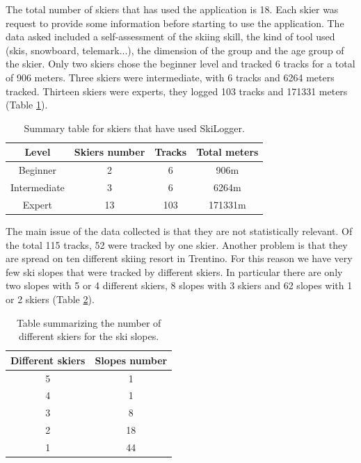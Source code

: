 \documentclass[12pt,a4paper,twoside]{book}
\begin{document}
The total number of skiers that has used the application is 18. Each skier was request to provide some information before starting to use the application. The data asked included a self-assessment of the skiing skill, the kind of tool used (skis, snowboard, telemark...), the dimension of the group and the age group of the skier. Only two skiers chose the beginner level and tracked 6 tracks for a total of 906 meters. Three skiers were intermediate, with 6 tracks and 6264 meters tracked. Thirteen skiers were experts, they logged 103 tracks and 171331 meters (Table \ref{skiers}).

\begin{table}[!h]
  \centering
  \begin{tabular}{ | c | c | c | c | }
    \hline
    Level & Skiers number & Tracks & Total meters \\
    \hline
    Beginner & 2  & 6 & 906m \\
    Intermediate & 3 & 6 & 6264m \\
    Expert & 13 & 103 & 171331m \\
    \hline
  \end{tabular}
  \caption{Summary table for skiers that have used SkiLogger.}
  \label{skiers}
\end{table}

The main issue of the data collected is that they are not statistically relevant. Of the total 115 tracks, 52 were tracked by one skier. Another problem is that they are spread on ten different skiing resort in Trentino. For this reason we have very few ski slopes that were tracked by different skiers. In particular there are only two slopes with 5 or 4 different skiers, 8 slopes with 3 skiers and 62 slopes with 1 or 2 skiers (Table \ref{slopes}).

\begin{table}[!h]
  \centering
  \begin{tabular}{ | c | c | }
    \hline
    Different skiers & Slopes number \\
    \hline
    5 & 1 \\
    4 & 1 \\
    3 & 8 \\
    2 & 18 \\
    1 & 44 \\
    \hline
  \end{tabular}
  \caption{Table summarizing the number of different skiers for the ski slopes.}
  \label{slopes}
\end{table}
\end{document}
